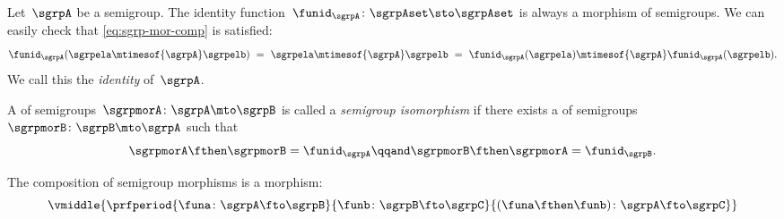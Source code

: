 \begin{ctdefinition}
    \label{def:identity-sgrp-mor}
    Let~$\sgrpA$ be a semigroup.
    The identity function~$\funid_\sgrpA\colon \sgrpAset \sto \sgrpAset$ is always a morphism of semigroups.
    We can easily check that \cref{eq:sgrp-mor-comp} is satisfied:
    \begin{equation}
        \label{eq:identity-sgrp-mor-proof}
        \funid_\sgrpA (\sgrpela \mtimesof{\sgrpA} \sgrpelb) \ = \  \sgrpela \mtimesof{\sgrpA} \sgrpelb
        \ = \
        \funid_\sgrpA (\sgrpela )\mtimesof{\sgrpA}\funid_\sgrpA(\sgrpelb).
    \end{equation}
    We call this the \emph{identity \whomo} of~$\sgrpA$.
\end{ctdefinition}
\showslides{%
    \begin{forslides}
        \begin{equation}
            \label{eq:identity-sgrp}
            \funid_\sgrpA\colon \sgrpAset \sto \sgrpAset
        \end{equation}
    \end{forslides}
}

\begin{ctdefinition}
    \label{def:semigroup-iso}
    A \whomo of semigroups~$\sgrpmorA\colon \sgrpA \mto \sgrpB$ is called a \emph{semigroup isomorphism} if there exists a \whomo of semigroups~$\sgrpmorB\colon \sgrpB \mto \sgrpA$ such that
    \begin{equation}
        \label{eq:sgrp-iso-cond}
        \sgrpmorA \fthen \sgrpmorB = \funid_\sgrpA
        \qqand
        \sgrpmorB \fthen \sgrpmorA = \funid_\sgrpB.
    \end{equation}
\end{ctdefinition}

\begin{lemma}
    \label{lem:semigroup-morphisms-compose}
    The composition of semigroup morphisms is a morphism:
    \begin{equation}
        \label{eq:sgrp-mor-compo}
        \vmiddle{
            \prfperiod{
                \funa  \colon \sgrpA \fto \sgrpB
            }{
                \funb \colon  \sgrpB \fto \sgrpC
            }{
                (\funa \fthen \funb)  \colon \sgrpA \fto \sgrpC
            }
        }
    \end{equation}
\end{lemma}


